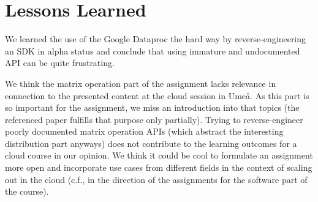 \documentclass{prog_report}
\begin{document}
\section{Lessons Learned}
We learned the use of the Google Dataproc the hard way by reverse-engineering an SDK in alpha status and conclude that using immature and undocumented API can be quite frustrating.

We think the matrix operation part of the assignment lacks relevance in connection to the presented content at the cloud session in Umeå.
As this part is so important for the assignment, we miss an introduction into that topics (the referenced paper fulfills that purpose only partially).
Trying to reverse-engineer poorly documented matrix operation APIs (which abstract the interesting distribution part anyways) does not contribute to the learning outcomes for a cloud course in our opinion.
We think it could be cool to formulate an assignment more open and incorporate use cases from different fields in the context of scaling out in the cloud (c.f., in the direction of the assignments for the software part of the course).



\end{document}
